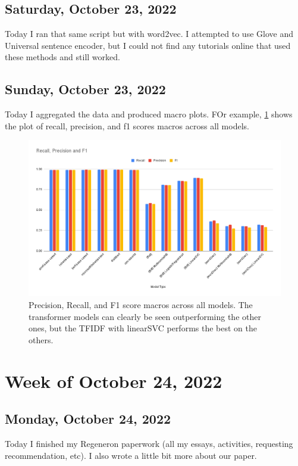 \documentclass[11pt,letterpaper]{article}
\begin{document}
\subsection{Saturday, October 23, 2022}
Today I ran that same script but with word2vec. I attempted to use Glove and Universal sentence encoder, but I could not find any tutorials online that used these methods and still worked. 

\subsection{Sunday, October 23, 2022}
Today I aggregated the data and produced macro plots. FOr example, \ref{fig:macros} shows the plot of recall, precision, and f1 scores macros across all models.


\begin{figure}
    \centering
    \includegraphics[scale=0.4]{images/macros.png}
    \caption{Precision, Recall, and F1 score macros across all models. The transformer models can clearly be seen outperforming the other ones, but the TFIDF with linearSVC performs the best on the others.}
    \label{fig:macros}
\end{figure}

\section{Week of October 24, 2022}
\subsection{Monday, October 24, 2022}
Today I finished my Regeneron paperwork (all my essays, activities, requesting recommendation, etc). I also wrote a little bit more about our paper.
\end{document}
